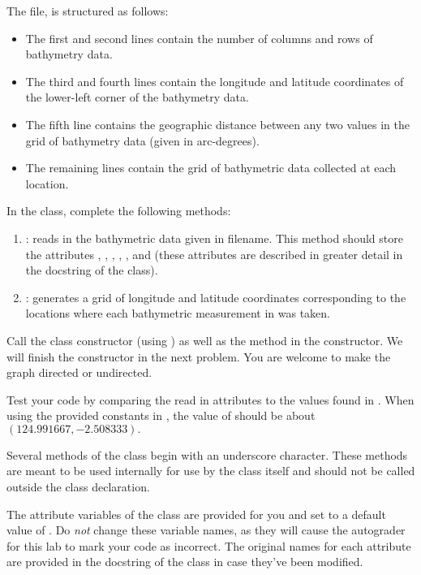The file,  is structured as follows:
\begin{itemize}
\item The first and second lines contain the number of columns and rows of bathymetry data.
\item The third and fourth lines contain the longitude and latitude coordinates of the lower-left corner of the bathymetry data.
\item The fifth line contains the geographic distance between any two values in the grid of bathymetry data (given in arc-degrees).
\item The remaining lines contain the grid of bathymetric data collected at each location.
\end{itemize}

\begin{problem}
In the  class, complete the following methods:

\begin{enumerate}
\item {}: reads in the bathymetric data given in filename.
This method should store the attributes , , , , , and (these attributes are described in greater detail in the docstring of the  class).
\item {}: generates a grid of longitude and latitude coordinates corresponding to the locations where each bathymetric measurement in  was taken.
\end{enumerate}
Call the  class constructor (using ) as well as the  method in the  constructor.
We will finish the constructor in the next problem.
You are welcome to make the graph directed or undirected.
\end{problem}
Test your code by comparing the read in attributes to the values found in .
When using the provided constants in , the value of  should be about $(124.991667,-2.508333).$

\begin{info}
Several methods of the  class begin with an underscore character.
These methods are meant to be used internally for use by the class itself and should not be called outside the class declaration.
\end{info}

\begin{warn}
The attribute variables of the  class are provided for you and set to a default value of .
Do \emph{not} change these variable names, as they will cause the autograder for this lab to mark your code as incorrect.
The original names for each attribute are provided in the docstring of the  class in case they've been modified.
\end{warn}

